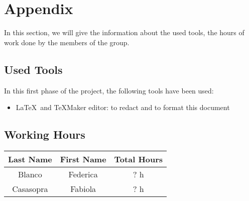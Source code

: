\section{Appendix} \label{sec:appendix}

In this section, we will give the information about the used tools, the hours of work done by the members of the group.

\subsection{Used Tools} \label{tools}

In this first phase of the project, the following tools have been used:

\begin{itemize}
	\item \LaTeX\ and TeXMaker editor: to redact and to format this document
\end{itemize}

\subsection{Working Hours} \label{worked}

\begin{table}[htbp]
\begin{center}
\begin{tabular}[t]{ccc}

\hline
\textbf{Last Name} & \textbf{First Name} & \textbf{Total Hours} \\
\hline
Blanco & Federica &  ? h\\
\hline
Casasopra & Fabiola &  ? h\\
\hline

\end{tabular}
\end{center}
\end{table}


